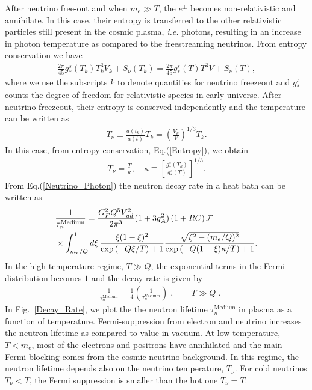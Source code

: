 After neutrino free-out and when $m_e\gg T$, the $e^{\pm}$ becomes non-relativistic and annihilate. In this case, their entropy is transferred to the other relativistic particles still present in the cosmic plasma, {\it i.e.\/} photons, resulting in an increase in photon temperature as compared to the freestreaming neutrinos. From entropy conservation we have
\begin{align}
\label{Entropy}
\frac{2\pi}{45}g^s_\ast(T_k)T^3_kV_k+S_{\nu}(T_k)=\frac{2\pi}{45}g^s_\ast(T)T^3V+S_{\nu}(T),
\end{align}
where we use the subscripts $k$ to denote quantities for neutrino freezeout and $g^s_\ast$ counts the degree of freedom for relativistic species in early universe. After neutrino freezeout, their entropy is conserved independently and the temperature can be written as
\begin{align}
T_\nu\equiv\frac{a(t_k)}{a(t)}T_k=\left(\frac{V_k}{V}\right)^{1/3}T_k.
\end{align}
In this case, from entropy conservation, Eq.(\ref{Entropy}), we obtain
\begin{align}
\label{Neutrino_Photon}
T_\nu=\frac{T}{\kappa},\,\,\,\,\,\,\kappa\equiv\left[\frac{g^s_\ast(T_k)}{g^s_\ast(T)}\right]^{1/3}.
\end{align}
From Eq.(\ref{Neutrino_Photon}) the neutron decay rate in a heat bath can be written as
\begin{align}
\label{Decay_rate_03}
&\frac{1}{\tau_n^\mathrm{Medium}}= \frac{G^2_FQ^5V^2_{ud}}{2\pi^3}(1+3g^2_A)\,(1+RC)\,\mathcal{F}\\
&\times\int^1_{m_e/Q}d\xi\,\frac{\xi(1-\xi)^2}{\exp\left(-Q\xi/{T}\right)+1}\frac{\sqrt{\xi^2-(m_e/Q)^2}}{\exp\left(-Q(1-\xi)\kappa/T\right)+1}.\notag
\end{align}
In the high temperature regime, $T\gg Q$, the exponential terms in the Fermi distribution becomes $1$ and the decay rate is given by
\begin{align}
&\frac{1}{\tau_n^\mathrm{Medium}}=\frac{1}{4}\left(\frac{1}{\tau_n^\mathrm{Vacuum}}\right)\;,
\qquad
T\gg Q\;.
\end{align}
In Fig.~\ref{Decay_Rate}, we plot the the neutron lifetime $\tau^\mathrm{Medium}_n$ in plasma as a function of temperature. Fermi-suppression from electron and neutrino increases the neutron lifetime as compared to value in vacuum. At low temperature, $T<m_e$, most of the electrons and positrons have annihilated and the main Fermi-blocking comes from the cosmic neutrino background. In this regime, the neutron lifetime depends also on the neutrino temperature, $T_\nu$. For cold neutrinos $T_\nu<T$, the Fermi suppression is smaller than the hot one $T_\nu=T$. 
